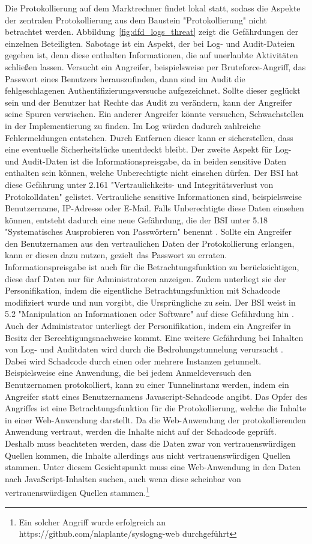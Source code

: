\documentclass[11pt,a4paper]{report}
\begin{document}
Die Protokollierung auf dem Marktrechner findet lokal statt, sodass die Aspekte der zentralen Protokollierung aus dem Baustein "Protokollierung" nicht betrachtet werden. Abbildung~\ref{fig:dfd_logs_threat} zeigt die Gefährdungen der einzelnen Beteiligten. Sabotage ist ein Aspekt, der bei Log- und Audit-Dateien gegeben ist, denn diese enthalten Informationen, die auf unerlaubte Aktivitäten schließen lassen. Versucht ein Angreifer, beispielsweise per Bruteforce-Angriff, das Passwort eines Benutzers herauszufinden, dann sind im Audit die fehlgeschlagenen Authentifizierungsversuche aufgezeichnet. Sollte dieser geglückt sein und der Benutzer hat Rechte das Audit zu verändern, kann der Angreifer seine Spuren verwischen. Ein anderer Angreifer könnte versuchen, Schwachstellen in der Implementierung zu finden. Im Log würden dadurch zahlreiche Fehlermeldungen entstehen. Durch Entfernen dieser kann er sicherstellen, dass eine eventuelle Sicherheitslücke unentdeckt bleibt. Der zweite Aspekt für Log- und Audit-Daten ist die Informationspreisgabe, da in beiden sensitive Daten enthalten sein können, welche Unberechtigte nicht einsehen dürfen. Der BSI hat diese Gefährung unter 2.161 "Vertraulichkeits- und Integritätsverlust von Protokolldaten" \cite{bsi_g2161} gelistet. Vertrauliche sensitive Informationen sind, beispielsweise Benutzername, IP-Adresse oder E-Mail. Falls Unberechtigte diese Daten einsehen können, entsteht dadurch eine neue Gefährdung, die der BSI unter 5.18 "Systematisches Ausprobieren von Passwörtern" benennt \cite{bsi_g5018}. Sollte ein Angreifer den Benutzernamen aus den vertraulichen Daten der Protokollierung erlangen, kann er diesen dazu nutzen, gezielt das Passwort zu erraten. Informationspreisgabe ist auch für die Betrachtungsfunktion zu berücksichtigen, diese darf Daten nur für Administratoren anzeigen. Zudem unterliegt sie der Personifikation, indem die eigentliche Betrachtungsfunktion mit Schadcode modifiziert wurde und nun vorgibt, die Ursprüngliche zu sein. Der BSI weist in 5.2 "Manipulation an Informationen oder Software" auf diese Gefährdung hin \cite{bsi_g5002}. Auch der Administrator unterliegt der Personifikation, indem ein Angreifer in Besitz der Berechtigungsnachweise kommt. Eine weitere Gefährdung bei Inhalten von Log- und Auditdaten wird durch die Bedrohungstunnelung verursacht \cite[s.~265]{gutmann}. Dabei wird Schadcode durch einen oder mehrere Instanzen getunnelt. Beispielsweise eine Anwendung, die bei jedem Anmeldeversuch den Benutzernamen protokolliert, kann zu einer Tunnelinstanz werden, indem ein Angreifer statt eines Benutzernamens Javascript-Schadcode angibt. Das Opfer des Angriffes ist eine Betrachtungsfunktion für die Protokollierung, welche die Inhalte in einer Web-Anwendung darstellt. Da die Web-Anwendung der protokollierenden Anwendung vertraut, werden die Inhalte nicht auf der Schadcode geprüft. Deshalb muss beachteten werden, dass die Daten zwar von vertrauenswürdigen Quellen kommen, die Inhalte allerdings aus nicht vertrauenswürdigen Quellen stammen. Unter diesem Gesichtspunkt muss eine Web-Anwendung in den Daten nach JavaScript-Inhalten suchen, auch wenn diese scheinbar von vertrauenswürdigen Quellen stammen.\footnote{Ein solcher Angriff wurde erfolgreich an https://github.com/nlaplante/syslogng-web durchgeführt}
\end{document}
